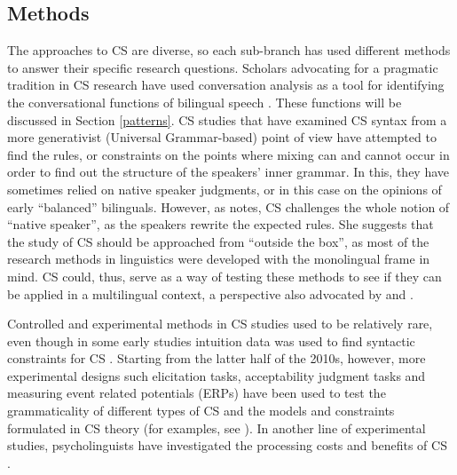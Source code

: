 \documentclass[output=paper]{langscibook}
\begin{document}
\subsection{Methods}
The approaches to CS are diverse, so each sub-branch has used different methods to answer their specific research questions. Scholars advocating for a pragmatic tradition in CS research have used conversation analysis as a tool for identifying the conversational functions of bilingual speech \parencite{auer1988conversation,auer1998code}. These functions will be discussed in Section \ref{patterns}. CS studies that have examined CS syntax from a more generativist (Universal Grammar-based) point of view have attempted to find the rules, or constraints on the points where mixing can and cannot occur in order to find out the structure of the speakers' inner grammar. In this, they have sometimes relied on native speaker judgments, or in this case on the opinions of early “balanced” bilinguals. However, as \textcite[18]{gardner2009code} notes, CS challenges the whole notion of  “native speaker”, as the speakers rewrite the expected rules. She suggests that the study of CS should be approached from “outside the box”, as most of the research methods in linguistics were developed with the monolingual frame in mind. CS could, thus, serve as a way of testing these methods to see if they can be applied in a multilingual context, a perspective also advocated by \textcite{lopez2020bilingual} and \textcite{wyngaerd2021bilingual}. 

Controlled and experimental methods in CS studies used to be relatively rare, even though in some early studies intuition data was used to find syntactic constraints for CS \textcite[22]{gullberg2009technique}. Starting from the latter half of the 2010s, however, more experimental designs such elicitation tasks, acceptability judgment tasks and measuring event related potentials (ERPs) have been used to test the grammaticality of different types of CS and the models and constraints formulated in CS theory (for examples, see \citealt{couto2016gender,couto2017chapter,vaughanetal2020switchmate,bellamyetal2022el}). In another line of experimental studies, psycholinguists have  investigated the processing costs and benefits of CS \parencite{tomicetal2022expecting}.
\end{document}
